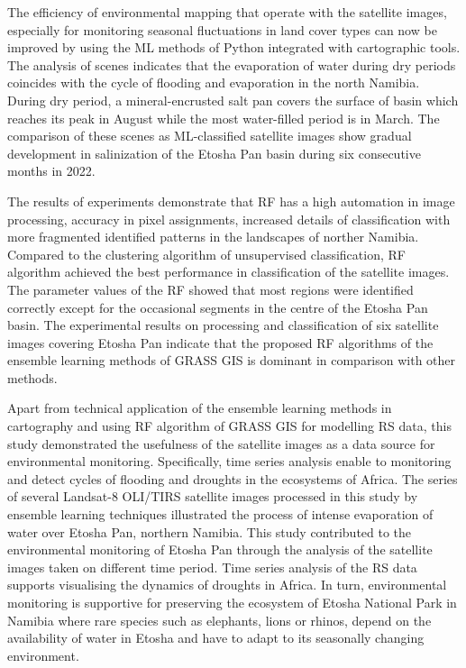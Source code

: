 \documentclass[climate,article,submit,pdftex,moreauthors]{Definitions/mdpi}
\begin{document}
The efficiency of environmental mapping that operate with the satellite images, especially for monitoring seasonal fluctuations in land cover types can now be improved by using the {ML} methods of Python integrated with cartographic tools. {The} analysis of scenes indicates that the evaporation of water during dry periods coincides with the cycle of flooding and evaporation in the north Namibia. During dry period, a mineral-encrusted salt pan covers the surface of basin which reaches its peak in August while the most water-filled period is in March. The comparison of these scenes as ML-classified satellite images show gradual development in salinization of the Etosha Pan basin during six consecutive months in 2022. 

The results of experiments demonstrate that RF has a high automation in image processing, accuracy in pixel assignments, increased details of classification with more fragmented identified patterns in the landscapes of norther Namibia. Compared to the clustering algorithm of unsupervised classification, {RF} algorithm achieved the best performance in classification of the satellite images. The parameter values of the RF showed that most regions were identified correctly except for the occasional segments in the centre of the Etosha Pan basin.{ }The experimental results on processing and classification of six satellite images covering Etosha Pan indicate that the proposed RF algorithms of the ensemble learning methods of GRASS GIS is dominant in comparison with other methods{.}

Apart from technical application of the ensemble learning methods in cartography and using RF algorithm of GRASS GIS for modelling RS data, this study demonstrated the usefulness of the satellite images as a data source for environmental monitoring. Specifically, time series analysis enable to monitoring and detect cycles of flooding and droughts in the ecosystems of Africa. The series of several Landsat-8 OLI/TIRS satellite images processed in this study by ensemble learning techniques illustrated the process of intense evaporation of water over Etosha Pan, northern Namibia. This study contributed to the environmental monitoring of Etosha Pan through the analysis of the satellite images taken on different time period. Time series analysis of the RS data supports visualising the dynamics of droughts in Africa. In turn, environmental monitoring is supportive for preserving the ecosystem of Etosha National Park in Namibia where rare species such as elephants, lions or rhinos, depend on the availability of water in Etosha and have to adapt to its seasonally changing environment. 
\end{document}
